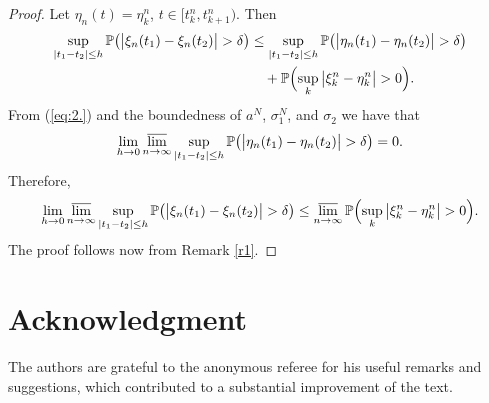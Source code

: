 \documentclass[numbers,compress,v1.0.1]{vmsta}
\theoremstyle{remark}
\renewcommand{\P}{\mathbb P}
\newcommand*{\abs}[1]{\left\lvert#1\right\rvert}
\begin{document}
%
\begin{proof}
Let $\eta_n(t)=\eta_k^n$, $t\in[t_k^n,t_{k+1}^n)$. Then
%
\begin{align*}
\sup_{\abs{t_1-t_2}\leq h} \P\bigl(\big|\xi_n(t_1) -
\xi_n(t_2) \big| >\delta \bigr)&\leq\sup_{\abs{ t_1-t_2 } \leq h}
\P\bigl(\big| \eta_n(t_1) -\eta_n(t_2)
\big| >\delta\bigr)
\\
&\quad+ \P\Bigl(\sup_k \big| \xi_k^n -
\eta_k^n \big| >0\Bigr).
\end{align*}
%
From (\ref{eq:2.}) and the boundedness of $a^N$, $\sigma_1^N$, and
$\sigma_2$ we have that
%
\[
\lim_{h\rightarrow0}\varlimsup_{n\rightarrow\infty}\sup_{\abs
{t_1-t_2} \leq h}
\P\bigl(\big|\eta_n(t_1) -\eta_n(t_2)\big|
>\delta\bigr)=0.
\]
%
Therefore,
%
\[
\lim_{h\rightarrow0}\varlimsup_{n\rightarrow\infty}\sup_{\abs
{t_1-t_2} \leq h}
\P\bigl(\big| \xi_n(t_1) -\xi_n(t_2)
\big| >\delta\bigr) \leq \varlimsup_{n\rightarrow\infty}\P\Bigl(\sup_k
\big| \xi_k^n -\eta_k^n \big| >0
\Bigr).
\]
%
The proof follows now from Remark \ref{r1}.
\end{proof}

\section*{Acknowledgment}
The authors are grateful to the anonymous referee for his useful
remarks and suggestions, which contributed to a substantial improvement
of the text.


%
\end{document}
